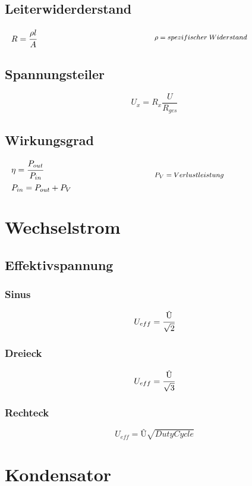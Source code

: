 \documentclass[12pt,a5paper,ngerman,titlepage]{article}
\begin{document}
\subsection{Leiterwiderderstand}
\[
\begin{minipage}{.5\linewidth}
  $R=\cfrac{\rho l}{A}$ 
\end{minipage}%
\begin{minipage}{.5\linewidth}
  \fontsize{8pt}{9pt}\selectfont
  $\rho = spezifischer \; Widerstand$

\end{minipage}
\]
\subsection{Spannungsteiler}
$$U_{x}=R_{x}\frac{U}{R_{ges}}$$

\subsection{Wirkungsgrad}
\[
\begin{minipage}{.5\linewidth}
  $\eta = \cfrac{P_{out}}{P_{in}}$ \\[5pt]
  $P_{in} = P_{out}+P_{V}$
\end{minipage}%
\begin{minipage}{.5\linewidth}
  \fontsize{8pt}{9pt}\selectfont
  $P_{V} = Verlustleistung$

\end{minipage}
\]
\newpage
\section{Wechselstrom}
\subsection{Effektivspannung}
\subsubsection{Sinus}
$$U_{eff}=\cfrac{\text{\^{U}}}{\sqrt{2}}$$
\subsubsection{Dreieck}
$$U_{eff}=\cfrac{\text{\^{U}}}{\sqrt{3}}$$
\subsubsection{Rechteck}
$$U_{eff}=\text{\^{U}}\sqrt{DutyCycle}$$
\newpage
\section{Kondensator}
\end{document}
